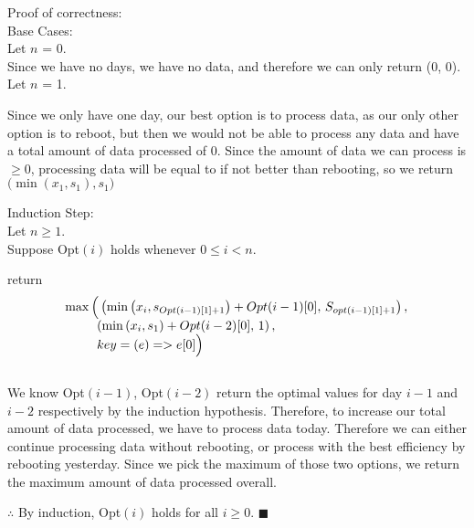 \documentclass[12pt]{article}
\begin{document}
\newpage
Proof of correctness:\\
Base Cases:\\
\hspace*{1em} Let $n$ = 0.\\
\hspace*{2em} Since we have no days, we have no data, and therefore we can only return (0, 0).\\
\hspace*{1em} Let $n$ = 1.
\begin{adjustwidth}{2em}{}
	Since we only have one day, our best option is to process data, as our only other option is to reboot, but then we would
	not be able to process any data and have a total amount of data processed of 0. Since the amount of data we can process
	is $\geq 0$, processing data will be equal to if not better than rebooting, so we return $\big(\min(x_1, s_1), s_1\big)$
\end{adjustwidth}

Induction Step:\\
\hspace*{1em} Let $n \geq 1$.\\
\hspace*{1em} Suppose Opt$(i)$ holds whenever $0 \leq i < n$.
\begin{adjustwidth}{2em}{}
	return
	\begin{equation*}
		\begin{array}{l}
			\max\Big(\left(\min\left(x_i, s_{Opt(i-1)[1]+1}\right) + Opt(i-1)[0],\, S_{opt(i-1)[1]+1}\right),\, \\\hspace*{2.5em} \left(\min\left(x_i, s_1\right) + Opt(i-2)[0],\, 1\right),\\\hspace*{2.5em} key=(e)=>e[0]\Big)
		\end{array}
	\end{equation*}\\
	We know Opt$(i-1)$, Opt$(i-2)$ return the optimal values for day $i-1$ and $i-2$ respectively by the induction hypothesis.
	Therefore, to increase our total amount of data processed, we have to process data today. Therefore we can either
	continue processing data without rebooting, or process with the best efficiency by rebooting yesterday.
	Since we pick the maximum of those two options, we return the maximum amount of data processed overall.
\end{adjustwidth}
\vspace{1em}
$\therefore$ By induction, Opt$(i)$ holds for all $i \geq 0$. \hfill $\blacksquare$
\end{document}
